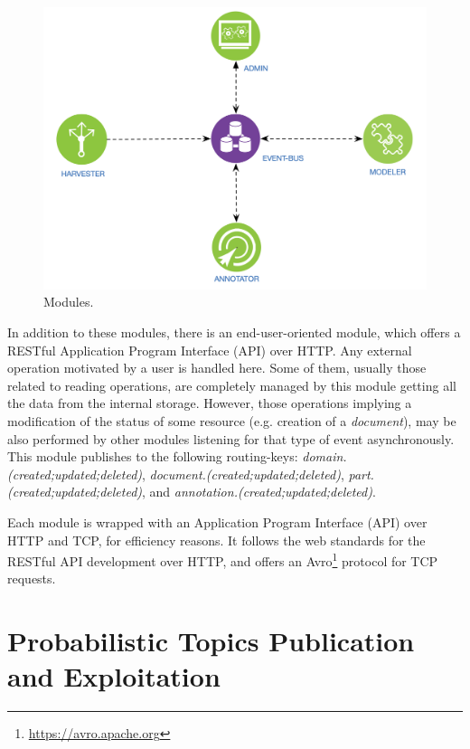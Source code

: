 \begin{figure}
  \includegraphics[scale=0.25]{modules}
  \caption{Modules.}
  \label{fig:librairy-modules}
\end{figure}


In addition to these modules, there is an end-user-oriented module, which offers a RESTful Application Program Interface (API) over HTTP. Any external operation motivated by a user is handled here. Some of them, usually those related to reading operations, are completely managed by this module getting all the data from the internal storage. However, those operations implying a modification of the status of some resource (e.g. creation of a \textit{document}), may be also performed by other modules listening for that type of event asynchronously. This module publishes to the following routing-keys: \textit{domain.(created;updated;deleted)}, \textit{document.(created;updated;deleted)}, \textit{part.(created;updated;deleted)}, and \textit{annotation.(created;updated;deleted)}.

Each module is wrapped with an Application Program Interface (API) over HTTP and TCP, for efficiency reasons. It follows the web standards for the RESTful API development over HTTP, and offers an Avro\footnote{\url{https://avro.apache.org}} protocol for TCP requests.  



\section{Probabilistic Topics Publication and Exploitation}



